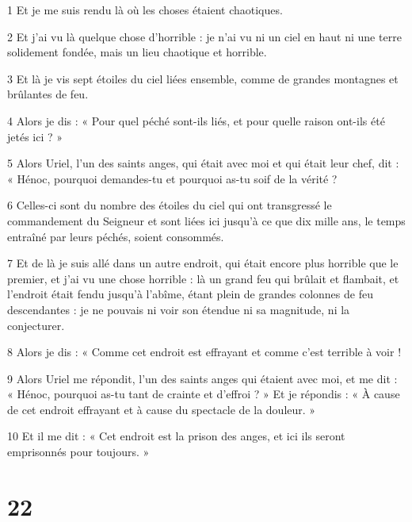 \par 1 Et je me suis rendu là où les choses étaient chaotiques.
\par 2 Et j'ai vu là quelque chose d'horrible : je n'ai vu ni un ciel en haut ni une terre solidement fondée, mais un lieu chaotique et horrible.
\par 3 Et là je vis sept étoiles du ciel liées ensemble, comme de grandes montagnes et brûlantes de feu.
\par 4 Alors je dis : « Pour quel péché sont-ils liés, et pour quelle raison ont-ils été jetés ici ? »
\par 5 Alors Uriel, l'un des saints anges, qui était avec moi et qui était leur chef, dit : « Hénoc, pourquoi demandes-tu et pourquoi as-tu soif de la vérité ?
\par 6 Celles-ci sont du nombre des étoiles du ciel qui ont transgressé le commandement du Seigneur et sont liées ici jusqu'à ce que dix mille ans, le temps entraîné par leurs péchés, soient consommés.
\par 7 Et de là je suis allé dans un autre endroit, qui était encore plus horrible que le premier, et j'ai vu une chose horrible : là un grand feu qui brûlait et flambait, et l'endroit était fendu jusqu'à l'abîme, étant plein de grandes colonnes de feu descendantes : je ne pouvais ni voir son étendue ni sa magnitude, ni la conjecturer.
\par 8 Alors je dis : « Comme cet endroit est effrayant et comme c'est terrible à voir !
\par 9 Alors Uriel me répondit, l'un des saints anges qui étaient avec moi, et me dit : « Hénoc, pourquoi as-tu tant de crainte et d'effroi ? » Et je répondis : « À cause de cet endroit effrayant et à cause du spectacle de la douleur. »
\par 10 Et il me dit : « Cet endroit est la prison des anges, et ici ils seront emprisonnés pour toujours. »

\chapter{22}

